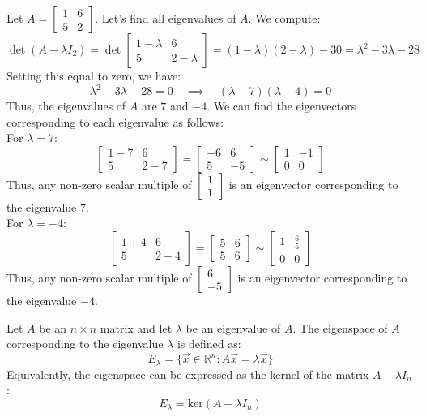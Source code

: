\begin{eg}
    Let $A = \begin{bmatrix}
        1 & 6 \\ 5 & 2
    \end{bmatrix}$. Let's find all eigenvalues of $A$. We compute:
    \[\det(A - \lambda I_2) = \det\begin{bmatrix}
        1 - \lambda & 6 \\ 5 & 2 - \lambda
    \end{bmatrix} = (1 - \lambda)(2 - \lambda) - 30 = \lambda^2 - 3 \lambda - 28\]
    Setting this equal to zero, we have:
    \[\lambda^2 - 3 \lambda - 28 = 0 \quad \implies \quad (\lambda - 7)(\lambda + 4) = 0\]
    Thus, the eigenvalues of $A$ are $7$ and $-4$. We can find the eigenvectors corresponding to each eigenvalue as follows: \\
    For $\lambda = 7$:
    \[\begin{bmatrix}
        1 - 7 & 6 \\ 5 & 2 - 7
    \end{bmatrix} = \begin{bmatrix}
        -6 & 6 \\ 5 & -5
    \end{bmatrix} \sim \begin{bmatrix}
        1 & -1 \\ 0 & 0
    \end{bmatrix}\]
    Thus, any non-zero scalar multiple of $\begin{bmatrix}
        1 \\ 1
    \end{bmatrix}$ is an eigenvector corresponding to the eigenvalue $7$. \\
    For $\lambda = -4$:
    \[\begin{bmatrix}
        1 + 4 & 6 \\ 5 & 2 + 4
    \end{bmatrix} = \begin{bmatrix}
        5 & 6 \\ 5 & 6
    \end{bmatrix} \sim \begin{bmatrix}
        1 & \frac{6}{5} \\ 0 & 0
    \end{bmatrix}\]
    Thus, any non-zero scalar multiple of $\begin{bmatrix}
        6 \\ -5
    \end{bmatrix}$ is an eigenvector corresponding to the eigenvalue $-4$.
\end{eg}
\begin{definition}[Eigenspace]
    Let $A$ be an $n \times n$ matrix and let $\lambda$ be an eigenvalue of $A$. The eigenspace of $A$ corresponding to the eigenvalue $\lambda$ is defined as:
    \[
        E_\lambda = \{\vec{x} \in \mathbb{R}^n : A \vec{x} = \lambda \vec{x}\}
    \]
    Equivalently, the eigenspace can be expressed as the kernel of the matrix $A - \lambda I_n$:
    \[
        E_\lambda = \text{ker}(A - \lambda I_n)
    \]
\end{definition}

